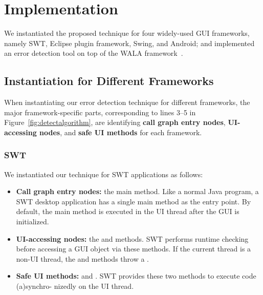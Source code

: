 
\tinystep
\tinystep
\section{Implementation}
\label{sec:implementation}

We instantiated the proposed technique for four widely-used
GUI frameworks, namely SWT, Eclipse plugin framework, Swing, and Android;
and implemented an error detection tool on top of the WALA framework~\cite{walatutorial}.

\tinystep


\subsection{Instantiation for Different Frameworks}
\label{sec:platforms}

When instantiating our error detection technique for different
frameworks, the major framework-specific parts, corresponding to
lines 3--5 in Figure~\ref{fig:detectalgorithm}, are identifying
\textbf{call graph entry nodes}, \textbf{UI-accessing nodes},
and \textbf{safe UI methods} for each framework.

\tinystep
\subsubsection{SWT}

 We instantiated our technique for SWT applications as follows:

\begin{itemize}
\smallstep

\item \textbf{Call graph entry nodes:}  the main method. Like a normal Java program,
a SWT desktop application has a single main method as the entry point. By default,
the main method is executed in the UI thread after the GUI
is initialized.

\smallstep

\item \textbf{UI-accessing nodes:}  the 
and \discretionary{}{}{}\discretionary{}{}{} methods. SWT performs
runtime checking before accessing a GUI object via these methods.
If the current thread is a non-UI thread, the 
and  methods throw a .

\smallstep

\item \textbf{Safe UI methods:}  
and . SWT provides these two methods
to execute code (a)synchro- nizedly on the UI thread.

\end{itemize}


